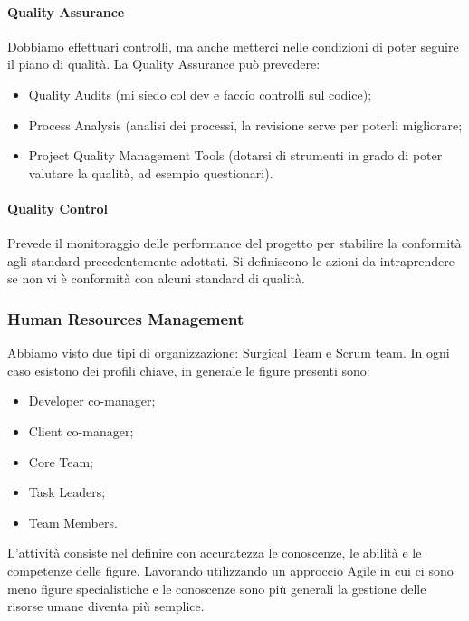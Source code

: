 \paragraph{Quality Assurance}
Dobbiamo effettuari controlli, ma anche metterci nelle condizioni di poter seguire il piano di qualità. La Quality Assurance può prevedere:
\begin{itemize}
	\item Quality Audits (mi siedo col dev e faccio controlli sul codice);
	\item Process Analysis (analisi dei processi, la revisione serve per poterli migliorare;
	\item Project Quality Management Tools (dotarsi di strumenti in grado di poter valutare la qualità, ad esempio questionari).
\end{itemize}
\paragraph{Quality Control}
Prevede il monitoraggio delle performance del progetto per stabilire la conformità agli standard precedentemente adottati. Si definiscono le azioni da intraprendere se non vi è conformità con alcuni standard di qualità.
\subsubsection{Human Resources Management}
Abbiamo visto due tipi di organizzazione: Surgical Team e Scrum team. In ogni caso esistono dei profili chiave, in generale le figure presenti sono:
\begin{itemize}
	\item Developer co-manager;
	\item Client co-manager;
	\item Core Team;
	\item Task Leaders;
	\item Team Members.
\end{itemize}
L'attività consiste nel definire con accuratezza le conoscenze, le abilità e le competenze delle figure. Lavorando utilizzando un approccio Agile in cui ci sono meno figure specialistiche e le conoscenze sono più generali la gestione delle risorse umane diventa più semplice.

